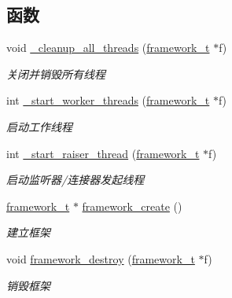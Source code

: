 \subsection*{函数}
\begin{DoxyCompactItemize}
\item 
void \hyperlink{a00051_a078a0669d562c7b17cf3116ab9ea9d72_a078a0669d562c7b17cf3116ab9ea9d72}{\+\_\+cleanup\+\_\+all\+\_\+threads} (\hyperlink{a00050_a6149d769f6f07ed14a40a271c95d8463_a6149d769f6f07ed14a40a271c95d8463}{framework\+\_\+t} $\ast$f)
\begin{DoxyCompactList}\small\item\em 关闭并销毁所有线程 \end{DoxyCompactList}\item 
int \hyperlink{a00051_a4d6a26c93873119bb08c47963705593b_a4d6a26c93873119bb08c47963705593b}{\+\_\+start\+\_\+worker\+\_\+threads} (\hyperlink{a00050_a6149d769f6f07ed14a40a271c95d8463_a6149d769f6f07ed14a40a271c95d8463}{framework\+\_\+t} $\ast$f)
\begin{DoxyCompactList}\small\item\em 启动工作线程 \end{DoxyCompactList}\item 
int \hyperlink{a00051_af20c94f693291564019fdc588d59d69c_af20c94f693291564019fdc588d59d69c}{\+\_\+start\+\_\+raiser\+\_\+thread} (\hyperlink{a00050_a6149d769f6f07ed14a40a271c95d8463_a6149d769f6f07ed14a40a271c95d8463}{framework\+\_\+t} $\ast$f)
\begin{DoxyCompactList}\small\item\em 启动监听器/连接器发起线程 \end{DoxyCompactList}\item 
\hyperlink{a00050_a6149d769f6f07ed14a40a271c95d8463_a6149d769f6f07ed14a40a271c95d8463}{framework\+\_\+t} $\ast$ \hyperlink{a00102_ga90b29a0c500209cb9b37437a32188a40_ga90b29a0c500209cb9b37437a32188a40}{framework\+\_\+create} ()
\begin{DoxyCompactList}\small\item\em 建立框架 \end{DoxyCompactList}\item 
void \hyperlink{a00102_gad1b6cb17014bfc515f8861bad3198e22_gad1b6cb17014bfc515f8861bad3198e22}{framework\+\_\+destroy} (\hyperlink{a00050_a6149d769f6f07ed14a40a271c95d8463_a6149d769f6f07ed14a40a271c95d8463}{framework\+\_\+t} $\ast$f)
\begin{DoxyCompactList}\small\item\em 销毁框架 \end{DoxyCompactList}\item 

\end{DoxyCompactItemize}
